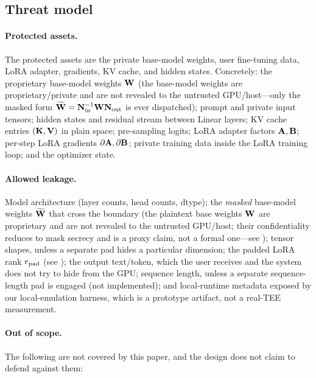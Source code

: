 \subsection{Threat model}

\paragraph{Protected assets.}
The protected assets are the private base-model weights, user fine-tuning data, LoRA adapter, gradients, KV cache, and hidden states. Concretely: the proprietary base-model weights $\mathbf{W}$ (the base-model weights are proprietary/private and are not revealed to the untrusted GPU/host---only the masked form $\widetilde{\mathbf{W}} = \mathbf{N}_{\mathrm{in}}^{-1}\mathbf{W}\mathbf{N}_{\mathrm{out}}$ is ever dispatched); prompt and private input tensors; hidden states and residual stream between Linear layers; KV cache entries $(\mathbf{K}, \mathbf{V})$ in plain space; pre-sampling logits; LoRA adapter factors $\mathbf{A}, \mathbf{B}$; per-step LoRA gradients $\partial\mathbf{A}, \partial\mathbf{B}$; private training data inside the LoRA training loop; and the optimizer state.

\paragraph{Allowed leakage.}
Model architecture (layer counts, head counts, dtype); the \emph{masked} base-model weights $\widetilde{\mathbf{W}}$ that cross the boundary (the plaintext base weights $\mathbf{W}$ are proprietary and are not revealed to the untrusted GPU/host; their confidentiality reduces to mask secrecy and is a proxy claim, not a formal one---see ); tensor shapes, unless a separate pad hides a particular dimension; the padded LoRA rank $r_{\mathrm{pad}}$ (see ); the output text/token, which the user receives and the system does not try to hide from the GPU; sequence length, unless a separate sequence-length pad is engaged (not implemented); and local-runtime metadata exposed by our local-emulation harness, which is a prototype artifact, not a real-TEE measurement.

\paragraph{Out of scope.}
The following are not covered by this paper, and the design does not claim to defend against them:


